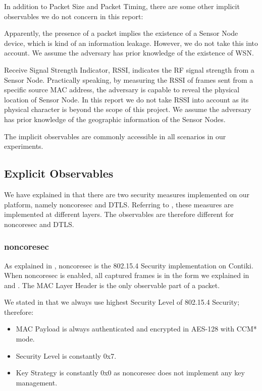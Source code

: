 In addition to Packet Size and Packet Timing, there are some other implicit observables we do not concern in this report:

\begin{description}[style=nextline]
	\item[Presence of Packets]
	Apparently, the presence of a packet implies the existence of a Sensor Node device, which is kind of an information leakage. However, we do not take this into account. We assume the adversary has prior knowledge of the existence of WSN.
	
	\item[RSSI]
	Receive Signal Strength Indicator, RSSI, indicates the RF signal strength from a Sensor Node. Practically speaking, by measuring the RSSI of frames sent from a specific source MAC address, the adversary is capable to reveal the physical location of Sensor Node. In this report we do not take RSSI into account as its physical character is beyond the scope of this project. We assume the adversary has prior knowledge of the geographic information of the Sensor Nodes.
\end{description}

The implicit observables are commonly accessible in all scenarios in our experiments.

\subsection{Explicit Observables}

We have explained in  that there are two security measures implemented on our platform, namely noncoresec and DTLS. Referring to , these measures are implemented at different layers. The observables are therefore different for noncoresec and DTLS. 

\subsubsection{noncoresec}

As explained in , noncoresec is the 802.15.4 Security implementation on Contiki. When noncoresec is enabled, all captured frames is in the form we explained in  and . The MAC Layer Header is the only observable part of a packet.

We stated in  that we always use highest Security Level of 802.15.4 Security; therefore:
\begin{itemize}
	\item MAC Payload is always authenticated and encrypted in AES-128 with CCM* mode.
	\item Security Level is constantly 0x7.
	\item Key Strategy is constantly 0x0 as noncoresec does not implement any key management.
\end{itemize}

